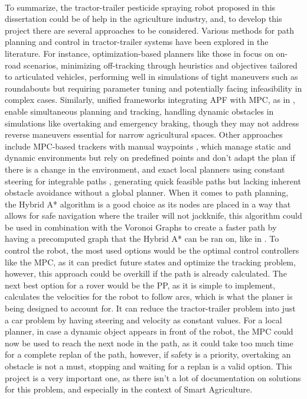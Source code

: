 \paragraph{}To summarize, the tractor-trailer pesticide spraying robot proposed in this 
dissertation could be of help in the agriculture industry, and, to develop this project 
there are several approaches to be considered. Various methods for path planning and control 
in tractor-trailer systems have been explored in the literature. For instance, 
optimization-based planners like those in \cite{lastapp} focus on on-road scenarios, 
minimizing off-tracking through heuristics and objectives tailored to articulated vehicles, 
performing well in simulations of tight maneuvers such as roundabouts but requiring parameter 
tuning and potentially facing infeasibility in complex cases. Similarly, unified frameworks 
integrating APF with MPC, as in \cite{APFAPP}, enable simultaneous planning and tracking, 
handling dynamic obstacles in simulations like overtaking and emergency braking, though they 
may not address reverse maneuvers essential for narrow agricultural spaces. Other approaches 
include MPC-based trackers with manual waypoints \cite{mpconly}, which manage static and 
dynamic environments but rely on predefined points and don't adapt the plan if there is a change 
in the environment, and exact local planners using constant steering for integrable paths \cite{ttex3}, 
generating quick feasible paths but lacking inherent obstacle avoidance without a global 
planner. When it comes to path planning, the Hybrid A* algorithm is a good choice as its 
nodes are placed in a way that allows for safe navigation where the trailer will not jackknife, 
this algorithm could be used in combination with the Voronoi Graphs to create a faster path 
by having a precomputed graph that the Hybrid A* can be ran on, like in \cite{theman}. 
To control the robot, the most used options would be the optimal control controllers like 
the \gls{MPC}, as it can predict future states and optimize the tracking problem, however, 
this approach could be overkill if the path is already calculated. The next best option for 
a rover would be the \gls{PP}, as it is simple to implement, calculates the velocities for 
the robot to follow arcs, which is what the planer is being designed to account for. It can reduce 
the tractor-trailer problem into just a car problem by having steering and velocity as 
constant values. For a local planner, in case a dynamic object appears in front of the robot, 
the \gls{MPC} could now be used to reach the next node in the path, as it could take too much 
time for a complete replan of the path, however, if safety is a priority, overtaking an 
obstacle is not a must, stopping and waiting for a replan is a valid option. This project 
is a very important one, as there isn't a lot of documentation on solutions for this problem, 
and especially in the context of Smart Agriculture.

